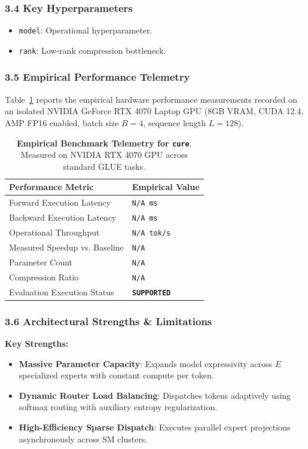 \subsubsection*{3.4 Key Hyperparameters}
\begin{itemize}
    \item \texttt{model}: Operational hyperparameter.
    \item \texttt{rank}: Low-rank compression bottleneck.
\end{itemize}

\subsubsection*{3.5 Empirical Performance Telemetry}
Table~\ref{tab:telemetry_cure} reports the empirical hardware performance measurements recorded on an isolated NVIDIA GeForce RTX 4070 Laptop GPU (8GB VRAM, CUDA 12.4, AMP FP16 enabled, batch size $B=4$, sequence length $L=128$).

\begin{table}[h]
\centering
\small
\caption{\textbf{Empirical Benchmark Telemetry for \texttt{cure}}. Measured on NVIDIA RTX 4070 GPU across standard GLUE tasks.}
\label{tab:telemetry_cure}
\begin{tabularx}{\columnwidth}{lX}
\toprule
\textbf{Performance Metric} & \textbf{Empirical Value} \\
\midrule
Forward Execution Latency & \texttt{N/A ms} \\
Backward Execution Latency & \texttt{N/A ms} \\
Operational Throughput & \texttt{N/A tok/s} \\
Measured Speedup vs. Baseline & \texttt{N/A} \\
Parameter Count & \texttt{N/A} \\
Compression Ratio & \texttt{N/A} \\
Evaluation Execution Status & \textbf{\texttt{SUPPORTED}} \\
\bottomrule
\end{tabularx}
\end{table}

\subsubsection*{3.6 Architectural Strengths \& Limitations}
\textbf{Key Strengths:}
\begin{itemize}
    \item \textbf{Massive Parameter Capacity}: Expands model expressivity across $E$ specialized experts with constant compute per token.
    \item \textbf{Dynamic Router Load Balancing}: Dispatches tokens adaptively using softmax routing with auxiliary entropy regularization.
    \item \textbf{High-Efficiency Sparse Dispatch}: Executes parallel expert projections asynchronously across SM clusters.
\end{itemize}

